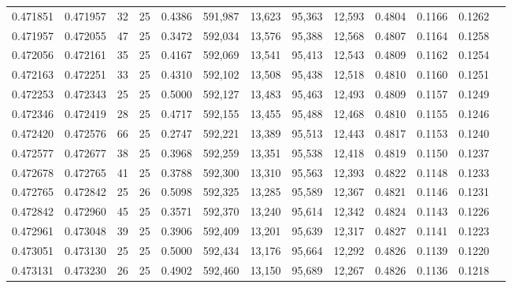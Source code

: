 \begin{tabular}{rrrrrrrrrrrrr}
0.471851 & 0.471957 &    32 &  25 &                                     0.4386 & 591,987 &  13,623 &  95,363 &  12,593 & 0.4804 & 0.1166 & 0.1262 \\
0.471957 & 0.472055 &    47 &  25 &                                     0.3472 & 592,034 &  13,576 &  95,388 &  12,568 & 0.4807 & 0.1164 & 0.1258 \\
0.472056 & 0.472161 &    35 &  25 &                                     0.4167 & 592,069 &  13,541 &  95,413 &  12,543 & 0.4809 & 0.1162 & 0.1254 \\
0.472163 & 0.472251 &    33 &  25 &                                     0.4310 & 592,102 &  13,508 &  95,438 &  12,518 & 0.4810 & 0.1160 & 0.1251 \\
0.472253 & 0.472343 &    25 &  25 &                                     0.5000 & 592,127 &  13,483 &  95,463 &  12,493 & 0.4809 & 0.1157 & 0.1249 \\
0.472346 & 0.472419 &    28 &  25 &                                     0.4717 & 592,155 &  13,455 &  95,488 &  12,468 & 0.4810 & 0.1155 & 0.1246 \\
0.472420 & 0.472576 &    66 &  25 &                                     0.2747 & 592,221 &  13,389 &  95,513 &  12,443 & 0.4817 & 0.1153 & 0.1240 \\
0.472577 & 0.472677 &    38 &  25 &                                     0.3968 & 592,259 &  13,351 &  95,538 &  12,418 & 0.4819 & 0.1150 & 0.1237 \\
0.472678 & 0.472765 &    41 &  25 &                                     0.3788 & 592,300 &  13,310 &  95,563 &  12,393 & 0.4822 & 0.1148 & 0.1233 \\
0.472765 & 0.472842 &    25 &  26 &                                     0.5098 & 592,325 &  13,285 &  95,589 &  12,367 & 0.4821 & 0.1146 & 0.1231 \\
0.472842 & 0.472960 &    45 &  25 &                                     0.3571 & 592,370 &  13,240 &  95,614 &  12,342 & 0.4824 & 0.1143 & 0.1226 \\
0.472961 & 0.473048 &    39 &  25 &                                     0.3906 & 592,409 &  13,201 &  95,639 &  12,317 & 0.4827 & 0.1141 & 0.1223 \\
0.473051 & 0.473130 &    25 &  25 &                                     0.5000 & 592,434 &  13,176 &  95,664 &  12,292 & 0.4826 & 0.1139 & 0.1220 \\
0.473131 & 0.473230 &    26 &  25 &                                     0.4902 & 592,460 &  13,150 &  95,689 &  12,267 & 0.4826 & 0.1136 & 0.1218 \\

\end{tabular}
